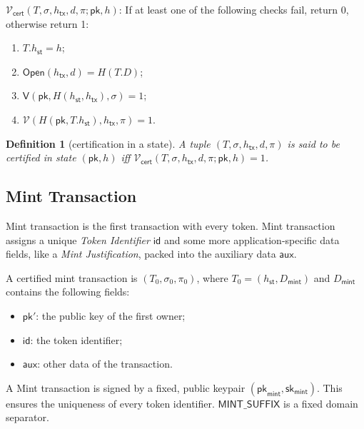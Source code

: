\documentclass{article}
\newtheorem{definition}{Definition}[section]
\newcommand{\sigver}[0]{\mathsf{V}}
\newcommand{\pubkey}[0]{\mathsf{pk}}
\newcommand{\prikey}[0]{\mathsf{sk}}
\newcommand{\open}[0]{\mathsf{Open}}
\newcommand{\sthash}[0]{h_\mathsf{st}}
\newcommand{\txhash}[0]{h_\mathsf{tx}}
\newcommand{\auxd}[0]{\mathsf{aux}}
\newcommand{\univer}[0]{\mathcal{V}}
\newcommand{\certver}[0]{\mathcal{V}_\mathsf{cert}}
\begin{document}
\noindent $\certver(T,\sigma,\txhash,d,\pi;\pubkey,h)$:
If at least one of the following checks fail, return 0, otherwise return 1:
\begin{enumerate}
\item $T.\sthash=h$;
\item $\open(\txhash,d)=H(T.D)$;
\item $\sigver(\pubkey, H(\sthash,\txhash),\sigma)=1$;
\item $\univer(H(\pubkey,T.\sthash),\txhash,\pi)=1$.
\end{enumerate}

\begin{definition}[certification in a state]\label{de:certstate}
A tuple $(T,\sigma,\txhash,d,\pi)$ is said to be \emph{certified in state} $(\pubkey,h)$ iff $\certver(T,\sigma,\txhash,d,\pi;\pubkey,h)=1$.
\end{definition}


\subsection{Mint Transaction}

Mint transaction is the first transaction with every token. Mint transaction assigns a unique \emph{Token Identifier} $\mathsf{id}$ and some more application-specific data fields, like a \emph{Mint Justification}, packed into the auxiliary data $\auxd$.

A certified mint transaction is $(T_0, \sigma_0, \pi_0)$, where $T_0 = (\sthash, D_\mathsf{mint})$ and $D_\mathsf{mint}$ contains the following fields:
\begin{itemize}
    \item $\pubkey'$: the public key of the first owner;
    \item $\mathsf{id}$: the token identifier;
    \item $\auxd$: other data of the transaction.
\end{itemize}

\noindent A Mint transaction is signed by a fixed, public keypair $(\pubkey_\mathsf{mint}, \prikey_\mathsf{mint})$. This ensures the uniqueness of every token identifier. $\mathsf{MINT\_SUFFIX}$ is a fixed domain separator.\medskip
\end{document}
